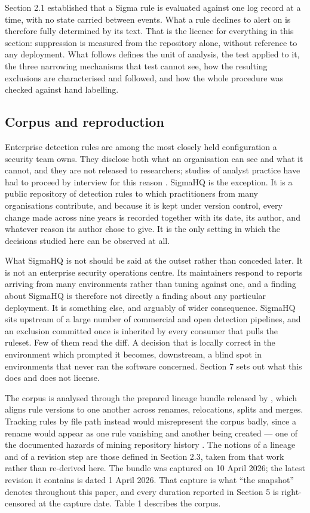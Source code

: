Section 2.1 established that a Sigma rule is evaluated against one log record at a time, with no state carried between events. What a rule declines to alert on is therefore fully determined by its text. That is the licence for everything in this section: suppression is measured from the repository alone, without reference to any deployment. What follows defines the unit of analysis, the test applied to it, the three narrowing mechanisms that test cannot see, how the resulting exclusions are characterised and followed, and how the whole procedure was checked against hand labelling.

\subsection{Corpus and reproduction}
\label{sec:corpus}

Enterprise detection rules are among the most closely held configuration a security team owns. They disclose both what an organisation can see and what it cannot, and they are not released to researchers; studies of analyst practice have had to proceed by interview for this reason \citep{alahmadi2022}. SigmaHQ is the exception. It is a public repository of detection rules to which practitioners from many organisations contribute, and because it is kept under version control, every change made across nine years is recorded together with its date, its author, and whatever reason its author chose to give. It is the only setting in which the decisions studied here can be observed at all.

What SigmaHQ is not should be said at the outset rather than conceded later. It is not an enterprise security operations centre. Its maintainers respond to reports arriving from many environments rather than tuning against one, and a finding about SigmaHQ is therefore not directly a finding about any particular deployment. It is something else, and arguably of wider consequence. SigmaHQ sits upstream of a large number of commercial and open detection pipelines, and an exclusion committed once is inherited by every consumer that pulls the ruleset. Few of them read the diff. A decision that is locally correct in the environment which prompted it becomes, downstream, a blind spot in environments that never ran the software concerned. Section 7 sets out what this does and does not license.

The corpus is analysed through the prepared lineage bundle released by \citet{long2026}, which aligns rule versions to one another across renames, relocations, splits and merges. Tracking rules by file path instead would misrepresent the corpus badly, since a rename would appear as one rule vanishing and another being created --- one of the documented hazards of mining repository history \citep{kalliamvakou2016}. The notions of a lineage and of a revision step are those defined in Section 2.3, taken from that work rather than re-derived here. The bundle was captured on 10 April 2026; the latest revision it contains is dated 1 April 2026. That capture is what ``the snapshot'' denotes throughout this paper, and every duration reported in Section 5 is right-censored at the capture date. Table 1 describes the corpus.

